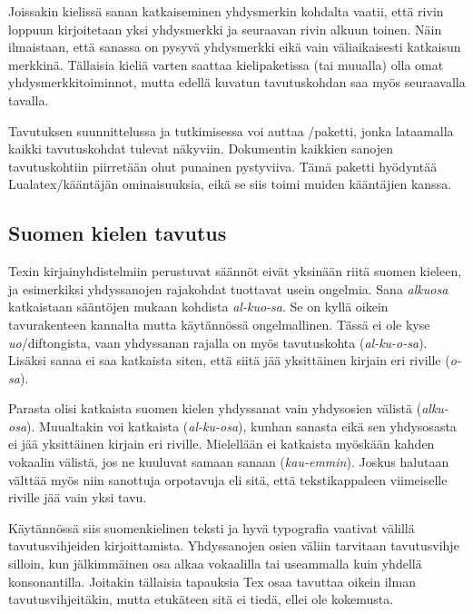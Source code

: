 \begin{koodilohkosis}
  \discretionary{}{}{}
\end{koodilohkosis}

Joissakin kielissä sanan katkaiseminen yhdysmerkin kohdalta vaatii, että
rivin loppuun kirjoitetaan yksi yhdysmerkki ja seuraavan rivin alkuun
toinen. Näin ilmaistaan, että sanassa on pysyvä yhdysmerkki eikä vain
väliaikaisesti katkaisun merkkinä. Tällaisia kieliä varten saattaa
kielipaketissa (tai muualla) olla omat yhdysmerkkitoiminnot, mutta
edellä kuvatun tavutuskohdan saa myös seuraavalla tavalla.

\begin{koodilohkosis}
  \discretionary{-}{-}{-}
\end{koodilohkosis}

Tavutuksen suunnittelussa ja tutkimisessa voi auttaa
\-/paketti, jonka
lataamalla kaikki tavutuskohdat tulevat näkyviin. Dokumentin kaikkien
sanojen tavutuskohtiin piirretään ohut punainen pystyviiva. Tämä paketti
hyödyntää Lualatex\-/kääntäjän ominaisuuksia, eikä se siis toimi muiden
kääntäjien kanssa.

\subsection{Suomen kielen tavutus}

Texin kirjainyhdistelmiin perustuvat säännöt eivät yksinään riitä suomen
kieleen, ja esimerkiksi yhdyssanojen rajakohdat tuottavat usein
ongelmia. Sana \emph{alku\-osa} katkaistaan sääntöjen mukaan kohdista
\emph{al-kuo-sa}. Se on kyllä oikein tavurakenteen kannalta mutta
käytännössä ongelmallinen. Tässä ei ole kyse \emph{uo}\-/diftongista,
vaan yhdyssanan rajalla on myös tavutuskohta (\emph{al-ku-o-sa}).
Lisäksi sanaa ei saa katkaista siten, että siitä jää yksittäinen kirjain
eri riville (\emph{o-sa}).

Parasta olisi katkaista suomen kielen yhdyssanat vain yhdys\-osien
välistä (\emph{alku-osa}). Muualtakin voi katkaista (\emph{al-ku-osa}),
kunhan sanasta eikä sen yhdys\-osasta ei jää yksittäinen kirjain eri
riville. Mielellään ei katkaista myöskään kahden vokaalin välistä, jos
ne kuuluvat samaan sanaan (\emph{kau-emmin}). Joskus halutaan välttää
myös niin sanottuja orpotavuja eli sitä, että tekstikappaleen
viimeiselle riville jää vain yksi tavu.

Käytännössä siis suomenkielinen teksti ja hyvä typografia vaativat
välillä tavutusvihjeiden kirjoittamista. Yhdyssanojen osien väliin
tarvitaan tavutusvihje silloin, kun jälkimmäinen osa alkaa vokaalilla
tai useammalla kuin yhdellä konsonantilla. Joitakin tällaisia tapauksia
Tex osaa tavuttaa oikein ilman tavutusvihjeitäkin, mutta etukäteen sitä
ei tiedä, ellei ole kokemusta.

